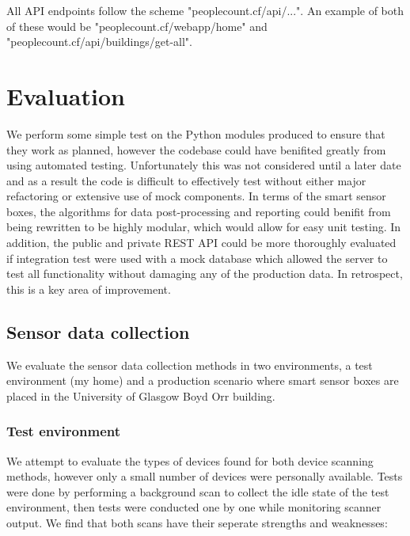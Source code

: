 \documentclass{l4proj}
\begin{document}
All API endpoints follow the scheme "peoplecount.cf/api/...". An example of both of these would be "peoplecount.cf/webapp/home" and "peoplecount.cf/api/buildings/get-all".




\chapter{Evaluation}

We perform some simple test on the Python modules produced to ensure that they work as planned, however the codebase could have benifited greatly from using automated testing. Unfortunately this was not considered until a later date and as a result the code is difficult to effectively test without either major refactoring or extensive use of mock components. In terms of the smart sensor boxes, the algorithms for data post-processing and reporting could benifit from being rewritten to be highly modular, which would allow for easy unit testing. In addition, the public and private REST API could be more thoroughly evaluated if integration test were used with a mock database which allowed the server to test all functionality without damaging any of the production data. In retrospect, this is a key area of improvement.


\section{Sensor data collection}

We evaluate the sensor data collection methods in two environments, a test environment (my home) and a production scenario where smart sensor boxes are placed in the University of Glasgow Boyd Orr building. 

\subsection{Test environment}
We attempt to evaluate the types of devices found for both device scanning methods, however only a small number of devices were personally available. Tests were done by performing a background scan to collect the idle state of the test environment, then tests were conducted one by one while monitoring scanner output. We find that both scans have their seperate strengths and weaknesses:
\end{document}
